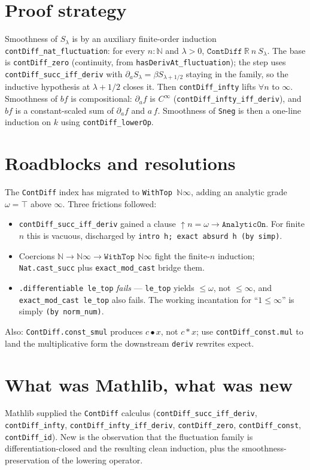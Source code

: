 \documentclass[11pt]{article}
\begin{document}
\section{Proof strategy}
Smoothness of $S_\lambda$ is by an auxiliary finite-order induction
\texttt{contDiff\_nat\_fluctuation}: for every $n:\mathbb N$ and $\lambda>0$,
$\texttt{ContDiff}\ \mathbb R\ n\ S_\lambda$. The base is \texttt{contDiff\_zero} (continuity, from
\texttt{hasDerivAt\_fluctuation}); the step uses \texttt{contDiff\_succ\_iff\_deriv} with
$\partial_a S_\lambda=\beta S_{\lambda+1/2}$ staying in the family, so the inductive hypothesis at
$\lambda+1/2$ closes it. Then \texttt{contDiff\_infty} lifts $\forall n$ to $\infty$. Smoothness of
$b f$ is compositional: $\partial_a f$ is $C^\infty$ (\texttt{contDiff\_infty\_iff\_deriv}), and $b f$
is a constant-scaled sum of $\partial_a f$ and $a\,f$. Smoothness of \texttt{Sneg} is then a one-line
induction on $k$ using \texttt{contDiff\_lowerOp}.

\section{Roadblocks and resolutions}
The \texttt{ContDiff} index has migrated to \texttt{WithTop $\mathbb N\infty$}, adding an analytic
grade $\omega=\top$ above $\infty$. Three frictions followed:
\begin{itemize}
\item \texttt{contDiff\_succ\_iff\_deriv} gained a clause $\uparrow n=\omega\to\texttt{AnalyticOn}$.
For finite $n$ this is vacuous, discharged by \texttt{intro h; exact absurd h (by simp)}.
\item Coercions $\mathbb N\to\mathbb N\infty\to\texttt{WithTop }\mathbb N\infty$ fight the finite-$n$
induction; \texttt{Nat.cast\_succ} plus \texttt{exact\_mod\_cast} bridge them.
\item \texttt{.differentiable le\_top} \emph{fails} --- \texttt{le\_top} yields $\le\omega$, not
$\le\infty$, and \texttt{exact\_mod\_cast le\_top} also fails. The working incantation for
``$1\le\infty$'' is simply \texttt{(by norm\_num)}.
\end{itemize}
Also: \texttt{ContDiff.const\_smul} produces $c\bullet x$, not $c*x$; use
\texttt{contDiff\_const.mul} to land the multiplicative form the downstream \texttt{deriv} rewrites
expect.

\section{What was Mathlib, what was new}
Mathlib supplied the \texttt{ContDiff} calculus (\texttt{contDiff\_succ\_iff\_deriv},
\texttt{contDiff\_infty}, \texttt{contDiff\_infty\_iff\_deriv}, \texttt{contDiff\_zero},
\texttt{contDiff\_const}, \texttt{contDiff\_id}). New is the observation that the fluctuation family
is differentiation-closed and the resulting clean induction, plus the smoothness-preservation of the
lowering operator.
\end{document}
